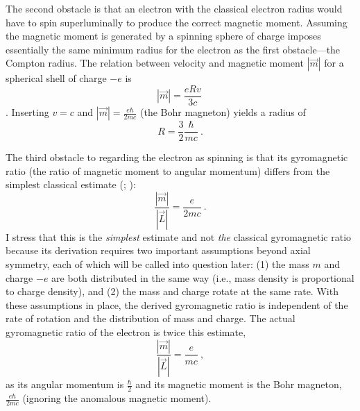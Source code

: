 \documentclass[12pt,secnumarabic,amsmath,amssymb,balancelastpage,nofootinbib]{article}
\begin{document}
The second obstacle is that an electron with the classical electron radius would have to spin superluminally to produce the correct magnetic moment.  Assuming the magnetic moment is generated by a spinning sphere of charge imposes essentially the same minimum radius for the electron as the first obstacle---the Compton radius.  The relation between velocity and magnetic moment $|\vec{m}|$ for a spherical shell of charge $-e$ is
\begin{equation}
|\vec{m}| = \frac{e R v}{3 c}\ 
\end{equation}
\citep[pg.\ 127]{rohrlich}.  Inserting $v=c$ and $|\vec{m}|=\frac{e \hbar}{2 m c}$ (the Bohr magneton) yields a radius of
\begin{equation}
R=\frac{3}{2}\frac{\hbar}{m c}\ .
\end{equation}

The third obstacle to regarding the electron as spinning is that its gyromagnetic ratio (the ratio of magnetic moment to angular momentum) differs from the simplest classical estimate (\citealp[problem 5.56]{griffiths}; \citealp[pg.\ 187]{jackson}):
\begin{equation}
\frac{|\vec{m}|}{|\vec{L}|}=\frac{e}{2 m c}\ .
\label{classicalGR}
\end{equation}
I stress that this is the \emph{simplest} estimate and not \emph{the} classical gyromagnetic ratio because its derivation requires two important assumptions beyond axial symmetry, each of which will be called into question later: (1) the mass $m$ and charge $-e$ are both distributed in the same way (i.e., mass density is proportional to charge density), and (2) the mass and charge rotate at the same rate.  With these assumptions in place, the derived gyromagnetic ratio is independent of the rate of rotation and the distribution of mass and charge.  The actual gyromagnetic ratio of the electron is twice this estimate,
\begin{equation}
\frac{|\vec{m}|}{|\vec{L}|}=\frac{e}{m c}\ ,
\label{quantumGR}
\end{equation}
as its angular momentum is $\frac{\hbar}{2}$ and its magnetic moment is the Bohr magneton, $\frac{e \hbar}{2 m c}$ (ignoring the anomalous magnetic moment).
\end{document}
